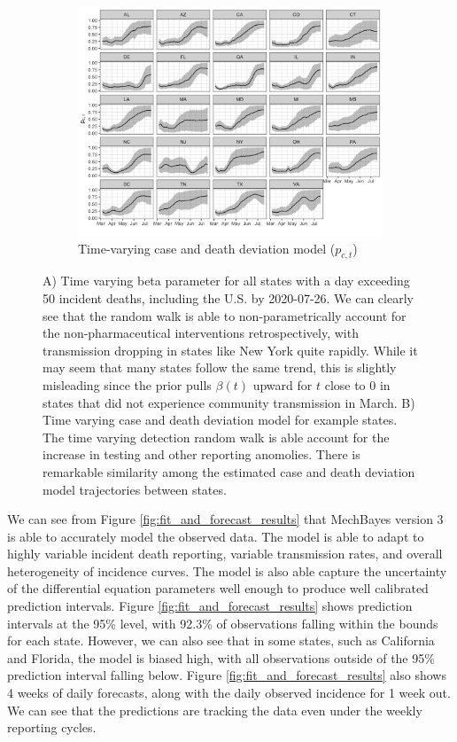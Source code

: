 \documentclass[11pt]{amsart}
\begin{document}
\begin{figure}
\begin{subfigure}{1\textwidth}
  \centering
    \includegraphics[scale=.15]{detection_plot.png}
    \caption{Time-varying case and death deviation model ($p_{c,t}$)}
\end{subfigure} 
 \caption{  A) Time varying beta parameter for all states with a day exceeding 50 incident deaths, including the U.S. by 2020-07-26. We can clearly see that the random walk is able to non-parametrically account for the non-pharmaceutical interventions retrospectively, with transmission dropping in states like New York quite rapidly. While it may seem that many states follow the same trend, this is slightly misleading since the prior pulls $\beta(t)$ upward for $t$ close to 0 in states that did not experience community transmission in March.  B) Time varying case and death deviation model for example states. The time varying detection random walk is able account for the increase in testing and other reporting anomolies. There is remarkable similarity among the estimated case and death deviation model trajectories between states.}
\label{fig:model_details}
\end{figure}


We can see from Figure \ref{fig:fit_and_forecast_results} that MechBayes version 3 is able to accurately model the observed data. The model is able to adapt to highly variable incident death reporting, variable transmission rates, and overall heterogeneity of incidence curves. The model is also able capture the uncertainty of the differential equation parameters well enough to produce well calibrated prediction intervals. Figure \ref{fig:fit_and_forecast_results}  shows prediction intervals at the 95\% level, with 92.3\% of observations falling within the bounds for each state. However, we can also see that in some states, such as California and Florida, the model is biased high, with all observations outside of the 95\% prediction interval falling below. Figure \ref{fig:fit_and_forecast_results}  also shows 4 weeks of daily forecasts, along with the daily observed incidence for 1 week out. We can see that the predictions are tracking the data even under the weekly reporting cycles. 
\end{document}
